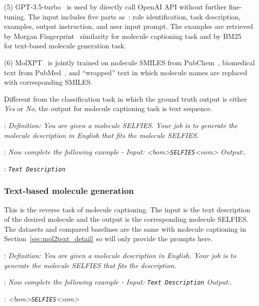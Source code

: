 \documentclass[11pt]{article}
\newcommand{\selfies}{\texttt{SELFIES}}
\newcommand{\text}{\texttt{Text Description}}
\begin{document}
\noindent(5) GPT-3.5-turbo~\citep{li2023empowering} is used by directly call OpenAI API without further fine-tuning. The input includes five parts as~\citet{li2023empowering}: role identification, task description, examples, output instruction, and user input prompt. The examples are retrieved by Morgan Fingerprint~\citep{DBLP:journals/jcisd/Butina99} similarity for molecule captioning task and by BM25~\citep{DBLP:journals/ftir/RobertsonZ09} for text-based molecule generation task.

\noindent(6) MolXPT~\cite{liu2023molxpt} is jointly trained on molecule SMILES from PubChem~\citep{kim2023pubchem}, biomedical text from PubMed~\citep{canese2013pubmed}, and ``wrapped'' text in which molecule names are replaced with corresponding SMILES.


\noindent Different from the classification task in which the ground truth output is either \textit{Yes} or \textit{No}, the output for molecule captioning task is text sequence.

:
\textit{Definition: You are given a molecule SELFIES. Your job is to generate the molecule description in English that fits the molecule SELFIES.}

:
\textit{Now complete the following example - Input: <bom>\selfies{}<eom> Output:}.

:
\textit{\text{}}

\subsubsection{Text-based molecule generation}
This is the reverse task of molecule captioning.
The input is the text description of the desired molecule and the output is the corresponding molecule SELFIES.
The datasets and compared baselines are the same with molecule captioning in Section~\ref{sec:mol2text_detail} so will only provide the prompts here.


:
\textit{Definition: You are given a molecule description in English. Your job is to generate the molecule SELFIES that fits the description.}

:
\textit{Now complete the following example - Input: \text{} Output:}.

:
\textit{<bom>\selfies{}<eom>}
\end{document}
